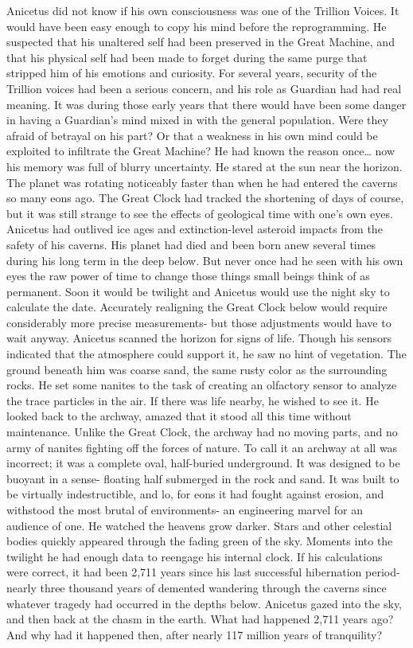 \documentclass[a4paper]{article}
\begin{document}
Anicetus did not know if his own consciousness was one of the Trillion Voices. It would have been easy enough to copy his mind before the reprogramming. He suspected that his unaltered self had been preserved in the Great Machine, and that his physical self had been made to forget during the same purge that stripped him of his emotions and curiosity. For several years, security of the Trillion voices had been a serious concern, and his role as Guardian had had real meaning. It was during those early years that there would have been some danger in having a Guardian’s mind mixed in with the general population. Were they afraid of betrayal on his part? Or that a weakness in his own mind could be exploited to infiltrate the Great Machine? He had known the reason once… now his memory was full of blurry uncertainty.
He stared at the sun near the horizon. The planet was rotating noticeably faster than when he had entered the caverns so many eons ago. The Great Clock had tracked the shortening of days of course, but it was still strange to see the effects of geological time with one's own eyes.
Anicetus had outlived ice ages and extinction-level asteroid impacts from the safety of his caverns. His planet had died and been born anew several times during his long term in the deep below. But never once had he seen with his own eyes the raw power of time to change those things small beings think of as permanent.
Soon it would be twilight and Anicetus would use the night sky to calculate the date. Accurately realigning the Great Clock below would require considerably more precise measurements- but those adjustments would have to wait anyway.
Anicetus scanned the horizon for signs of life. Though his sensors indicated that the atmosphere could support it, he saw no hint of vegetation. The ground beneath him was coarse sand, the same rusty color as the surrounding rocks. He set some nanites to the task of creating an olfactory sensor to analyze the trace particles in the air. If there was life nearby, he wished to see it.
He looked back to the archway, amazed that it stood all this time without maintenance. Unlike the Great Clock, the archway had no moving parts, and no army of nanites fighting off the forces of nature. To call it an archway at all was incorrect; it was a complete oval, half-buried underground. It was designed to be buoyant in a sense- floating half submerged in the rock and sand. It was built to be virtually indestructible, and lo, for eons it had fought against erosion, and withstood the most brutal of environments- an engineering marvel for an audience of one.
He watched the heavens grow darker. Stars and other celestial bodies quickly appeared through the fading green of the sky. Moments into the twilight he had enough data to reengage his internal clock. If his calculations were correct, it had been 2,711 years since his last successful hibernation period- nearly three thousand years of demented wandering through the caverns since whatever tragedy had occurred in the depths below.
Anicetus gazed into the sky, and then back at the chasm in the earth. What had happened 2,711 years ago? And why had it happened then, after nearly 117 million years of tranquility?
\end{document}
